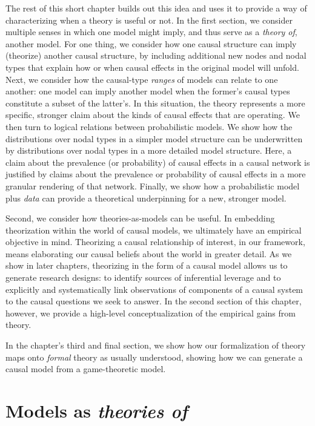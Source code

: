 \documentclass[
  12pt,
]{book}
\begin{document}
The rest of this short chapter builds out this idea and uses it to provide a way of characterizing when a theory is useful or not.
In the first section, we consider multiple senses in which one model might imply, and thus serve as a \emph{theory of}, another model. For one thing, we consider how one causal structure can imply (theorize) another causal structure, by including additional new nodes and nodal types that explain how or when causal effects in the original model will unfold. Next, we consider how the causal-type \emph{ranges} of models can relate to one another: one model can imply another model when the former's causal types constitute a subset of the latter's. In this situation, the theory represents a more specific, stronger claim about the kinds of causal effects that are operating. We then turn to logical relations between probabilistic models. We show how the distributions over nodal types in a simpler model structure can be underwritten by distributions over nodal types in a more detailed model structure. Here, a claim about the prevalence (or probability) of causal effects in a causal network is justified by claims about the prevalence or probability of causal effects in a more granular rendering of that network. Finally, we show how a probabilistic model plus \emph{data} can provide a theoretical underpinning for a new, stronger model.

Second, we consider how theories-as-models can be useful. In embedding theorization within the world of causal models, we ultimately have an empirical objective in mind. Theorizing a causal relationship of interest, in our framework, means elaborating our causal beliefs about the world in greater detail. As we show in later chapters, theorizing in the form of a causal model allows us to generate research designs: to identify sources of inferential leverage and to explicitly and systematically link observations of components of a causal system to the causal questions we seek to answer. In the second section of this chapter, however, we provide a high-level conceptualization of the empirical gains from theory.

In the chapter's third and final section, we show how our formalization of theory maps onto \emph{formal} theory as usually understood, showing how we can generate a causal model from a game-theoretic model.

\hypertarget{models-as-theories-of}{%
\section{\texorpdfstring{Models as \emph{theories of}}{Models as theories of}}\label{models-as-theories-of}}
\end{document}
